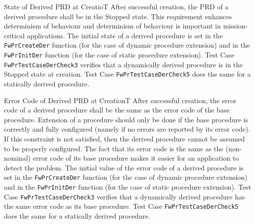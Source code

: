 \documentclass[a4paper,10pt]{article}
\newenvironment{fw_req}[6]
{\addtocounter{subsubsection}{1}
	\hspace{0.2cm}\textbf{FW-\arabic{section}.\arabic{subsection}.\arabic{subsubsection}/#2
	\hspace{0.8cm} #1}
	\vspace{-10pt}
\begin{longtable}{p{2.7cm}P{8.5cm}}
\hline
\textsc{Requirement} & #3 \\
\textsc{Justification} & #4 \\
\textsc{Implementation} & #5  \\ 
\textsc{Verification} & #6  \\
\hline
}
{\end{longtable}}
\begin{document}
\begin{fw_req}{State of Derived PRD at Creatio}{T}
{After successful creation, the PRD of a derived procedure shall be in the Stopped state.}
{This requirement enhances determinism of behaviour and determinism of behaviour is important in mission-critical applications.}
{The initial state of a derived procedure is set in the \texttt{FwPrCreateDer} function (for the case of dynamic procedure 
extension) and in the \texttt{FwPrInitDer} function (for the case of static procedure extension).} 
{Test Case \texttt{FwPrTestCaseDerCheck3} verifies that a dynamically 
derived procedure is in the Stopped state at creation.
Test Case \texttt{FwPrTestCaseDerCheck5} does the same for a statically derived procedure.}
\end{fw_req}


\begin{fw_req}{Error Code of Derived PRD at Creation}{T}
{After successful creation, the error code of a derived procedure shall be the same as the error code of the base procedure.}
{Extension of a procedure should only be done if the base procedure is correctly and fully configured (namely if no errors are reported by its error code). 
If this constraint is not satisfied, then the derived procedure cannot be assumed to be properly configured. 
The fact that its error code is the same as the (non-nominal) error code of its base procedure makes it easier for an application to detect the problem.}
{The initial value of the error code of a derived procedure is set in the \texttt{FwPrCreateDer} function (for the case of dynamic procedure extension) and in the \texttt{FwPrInitDer} function (for the case of static procedure extension).} 
{Test Case \texttt{FwPrTestCaseDerCheck3} verifies that a dynamically 
derived procedure has the same error code as its base procedure.
Test Case \texttt{FwPrTestCaseDerCheck5} does the same for a statically derived procedure.}
\end{fw_req}
\end{document}
